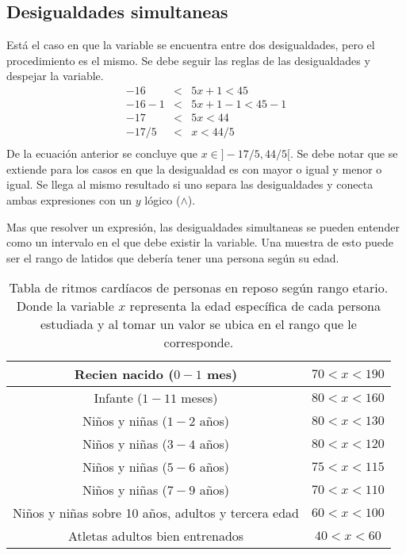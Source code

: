 \subsection{Desigualdades simultaneas}
Está el caso en que la variable se encuentra entre dos desigualdades, pero el procedimiento es el mismo. Se debe seguir las reglas de las desigualdades y despejar la variable.
\begin{eqnarray*}
-16&<&5x+1<45\\
-16-1&<&5x+1-1<45-1\\
-17&<&5x<44\\
-17/5&<&x<44/5\\
\end{eqnarray*}
De la ecuación anterior se concluye que $x\in ]-17/5,44/5[$. Se debe notar que se extiende para los casos en que la desigualdad es con mayor o igual y menor o igual. Se llega al mismo resultado si uno separa las desigualdades y conecta ambas expresiones con un $y$ lógico ($\wedge$).\\
\newpage
\begin{myexample}
Mas que resolver un expresión, las desigualdades simultaneas se pueden entender como un intervalo en el que debe existir la variable. Una muestra de esto puede ser el rango de latidos que debería tener una persona según su edad.
\end{myexample}

\begin{table}[h!]
\begin{center}
\begin{tabular}{|c|c|}
\hline
Recien nacido ($0-1$ mes)& $70<x<190$\\
\hline
Infante ($1-11$ meses)& $80<x<160$\\
\hline
Niños y niñas ($1-2$ años)& $80<x<130$\\
\hline
Niños y niñas ($3-4$ años)& $80<x<120$\\
\hline
Niños y niñas ($5-6$ años)& $75<x<115$\\
\hline
Niños y niñas ($7-9$ años)& $70<x<110$\\
\hline
Niños y niñas sobre 10 años, adultos y tercera edad & $60<x<100$\\
\hline
Atletas adultos bien entrenados & $40<x<60$\\
\hline
\end{tabular}
\caption[Tabla de ritmos cardíacos de personas en reposo según rango etario]{Tabla de ritmos cardíacos de personas en reposo según rango etario. Donde la variable $x$ representa la edad específica de cada persona estudiada y al tomar un valor se ubica en el rango que le corresponde.}
\end{center}
\end{table}

